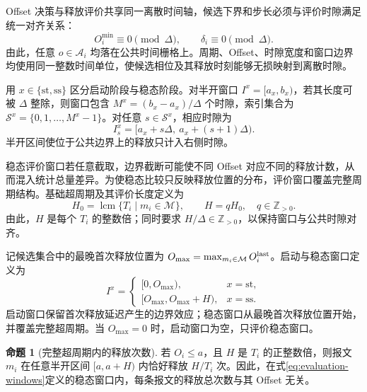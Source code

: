 \documentclass[UTF8,a4paper,twoside,zihao=-4]{ctexart}
\numberwithin{equation}{section}
\numberwithin{figure}{section}
\numberwithin{table}{section}
\theoremstyle{definition}
\newtheorem{proposition}{命题}
\DeclareMathOperator{\lcm}{lcm}
\newcommand{\Oset}{\mathcal{A}}
\newcommand{\Sset}{\mathcal{S}}
\newcommand{\Mset}{\mathcal{M}}
\numberwithin{algocf}{section}
\begin{document}
Offset 决策与释放评价共享同一离散时间轴，候选下界和步长必须与评价时隙满足统一对齐关系：
\begin{equation}
 O_i^{\min}\equiv0\pmod{\Delta},
 \qquad
 \delta_i\equiv0\pmod{\Delta}.
\label{eq:offset-grid-alignment}
\end{equation}
由此，任意 $o\in\Oset_i$ 均落在公共时间栅格上。周期、Offset、时隙宽度和窗口边界均使用同一整数时间单位，使候选相位及其释放时刻能够无损映射到离散时隙。

用 $x\in\{\mathrm{st},\mathrm{ss}\}$ 区分启动阶段与稳态阶段。对半开窗口 $I^x=[a_x,b_x)$，若其长度可被 $\Delta$ 整除，则窗口包含
$M^x=(b_x-a_x)/\Delta$ 个时隙，索引集合为
$\Sset^x=\{0,1,\ldots,M^x-1\}$。对任意 $s\in\Sset^x$，相应时隙为
\begin{equation}
 I_s^x=[a_x+s\Delta,\ a_x+(s+1)\Delta).
\label{eq:slot-discretization}
\end{equation}
半开区间使位于公共边界上的释放只计入右侧时隙。

稳态评价窗口若任意截取，边界截断可能使不同 Offset 对应不同的释放计数，从而混入统计总量差异。为使稳态比较只反映释放位置的分布，评价窗口覆盖完整周期结构。基础超周期及其评价长度定义为
\begin{equation}
 H_0=\lcm\{T_i\mid m_i\in\Mset\},
 \qquad
 H=qH_0,\quad q\in\mathbb Z_{>0}.
\label{eq:evaluation-hyperperiod}
\end{equation}
由此，$H$ 是每个 $T_i$ 的整数倍；同时要求 $H/\Delta\in\mathbb Z_{>0}$，以保持窗口与公共时隙对齐。

记候选集合中的最晚首次释放位置为
$O_{\max}=\max_{m_i\in\Mset}O_i^{\rm last}$。启动与稳态窗口定义为
\begin{equation}
 I^x=
 \begin{cases}
  [0,O_{\max}), & x=\mathrm{st},\\
  [O_{\max},O_{\max}+H), & x=\mathrm{ss}.
 \end{cases}
\label{eq:evaluation-windows}
\end{equation}
启动窗口保留首次释放延迟产生的边界效应；稳态窗口从最晚首次释放位置开始，并覆盖完整超周期。当 $O_{\max}=0$ 时，启动窗口为空，只评价稳态窗口。

\begin{proposition}[完整超周期内的释放次数]
\label{prop:hyperperiod-count}
若 $O_i\le a$，且 $H$ 是 $T_i$ 的正整数倍，则报文 $m_i$ 在任意半开区间 $[a,a+H)$ 内恰好释放 $H/T_i$ 次。因此，在式\eqref{eq:evaluation-windows}定义的稳态窗口内，每条报文的释放总次数与其 Offset 无关。
\end{proposition}
\end{document}

